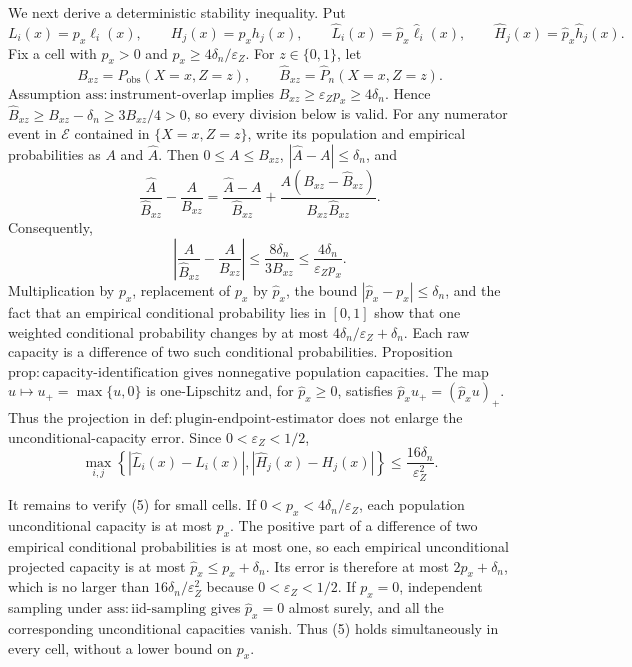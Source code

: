 We next derive a deterministic stability inequality.  Put
\[
L_i(x)=p_x\ell_i(x),\qquad H_j(x)=p_xh_j(x),\qquad
\widehat L_i(x)=\widehat p_x\widehat\ell_i(x),\qquad
\widehat H_j(x)=\widehat p_x\widehat h_j(x).
\]
Fix a cell with \(p_x>0\) and \(p_x\ge4\delta_n/\varepsilon_Z\).  For \(z\in\{0,1\}\), let
\[
B_{xz}=P_{\mathrm{obs}}(X=x,Z=z),\qquad
\widehat B_{xz}=\widehat P_n(X=x,Z=z).
\]
Assumption \(\mathrm{ass{:}instrument\text{-}overlap}\) implies \(B_{xz}\ge\varepsilon_Zp_x\ge4\delta_n\).  Hence \(\widehat B_{xz}\ge B_{xz}-\delta_n\ge3B_{xz}/4>0\), so every division below is valid.  For any numerator event in \(\mathcal E\) contained in \(\{X=x,Z=z\}\), write its population and empirical probabilities as \(A\) and \(\widehat A\).  Then \(0\le A\le B_{xz}\), \(|\widehat A-A|\le\delta_n\), and
\[
\frac{\widehat A}{\widehat B_{xz}}-\frac{A}{B_{xz}}
=\frac{\widehat A-A}{\widehat B_{xz}}
+\frac{A(B_{xz}-\widehat B_{xz})}
        {B_{xz}\widehat B_{xz}}.
\]
Consequently,
\[
\left|\frac{\widehat A}{\widehat B_{xz}}-
             \frac{A}{B_{xz}}\right|
\le\frac{8\delta_n}{3B_{xz}}
\le\frac{4\delta_n}{\varepsilon_Zp_x}.
\tag{4}
\]
Multiplication by \(p_x\), replacement of \(p_x\) by \(\widehat p_x\), the bound \(|\widehat p_x-p_x|\le\delta_n\), and the fact that an empirical conditional probability lies in \([0,1]\) show that one weighted conditional probability changes by at most \(4\delta_n/\varepsilon_Z+\delta_n\).  Each raw capacity is a difference of two such conditional probabilities.  Proposition \(\mathrm{prop{:}capacity\text{-}identification}\) gives nonnegative population capacities.  The map \(u\mapsto u_+=\max\{u,0\}\) is one-Lipschitz and, for \(\widehat p_x\ge0\), satisfies \(\widehat p_xu_+=(\widehat p_xu)_+\).  Thus the projection in \(\mathrm{def{:}plugin\text{-}endpoint\text{-}estimator}\) does not enlarge the unconditional-capacity error.  Since \(0<\varepsilon_Z<1/2\),
\[
\max_{i,j}\left\{|\widehat L_i(x)-L_i(x)|,
                    |\widehat H_j(x)-H_j(x)|\right\}
\le\frac{16\delta_n}{\varepsilon_Z^2}.
\tag{5}
\]

It remains to verify (5) for small cells.  If \(0<p_x<4\delta_n/\varepsilon_Z\), each population unconditional capacity is at most \(p_x\).  The positive part of a difference of two empirical conditional probabilities is at most one, so each empirical unconditional projected capacity is at most \(\widehat p_x\le p_x+\delta_n\).  Its error is therefore at most \(2p_x+\delta_n\), which is no larger than \(16\delta_n/\varepsilon_Z^2\) because \(0<\varepsilon_Z<1/2\).  If \(p_x=0\), independent sampling under \(\mathrm{ass{:}iid\text{-}sampling}\) gives \(\widehat p_x=0\) almost surely, and all the corresponding unconditional capacities vanish.  Thus (5) holds simultaneously in every cell, without a lower bound on \(p_x\).

